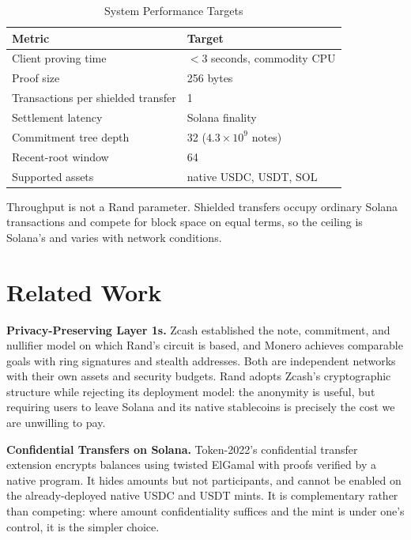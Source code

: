 \documentclass[11pt,a4paper]{article}
\begin{document}
\begin{table}[H]
\centering
\caption{System Performance Targets}
\begin{tabular}{@{}ll@{}}
\toprule
\textbf{Metric} & \textbf{Target} \\ \midrule
Client proving time & $<$3 seconds, commodity CPU \\
Proof size & 256 bytes \\
Transactions per shielded transfer & 1 \\
Settlement latency & Solana finality \\
Commitment tree depth & 32 ($4.3 \times 10^9$ notes) \\
Recent-root window & 64 \\
Supported assets & native USDC, USDT, SOL \\ \bottomrule
\end{tabular}
\end{table}

Throughput is not a Rand parameter. Shielded transfers occupy ordinary Solana transactions and compete for block space on equal terms, so the ceiling is Solana's and varies with network conditions.

\section{Related Work}
\label{sec:related}

\textbf{Privacy-Preserving Layer 1s.} Zcash \cite{Hopwood2016} established the note, commitment, and nullifier model on which Rand's circuit is based, and Monero \cite{Noether2015} achieves comparable goals with ring signatures and stealth addresses. Both are independent networks with their own assets and security budgets. Rand adopts Zcash's cryptographic structure while rejecting its deployment model: the anonymity is useful, but requiring users to leave Solana and its native stablecoins is precisely the cost we are unwilling to pay.

\textbf{Confidential Transfers on Solana.} Token-2022's confidential transfer extension \cite{SolanaToken2022} encrypts balances using twisted ElGamal with proofs verified by a native program. It hides amounts but not participants, and cannot be enabled on the already-deployed native USDC and USDT mints. It is complementary rather than competing: where amount confidentiality suffices and the mint is under one's control, it is the simpler choice.
\end{document}
